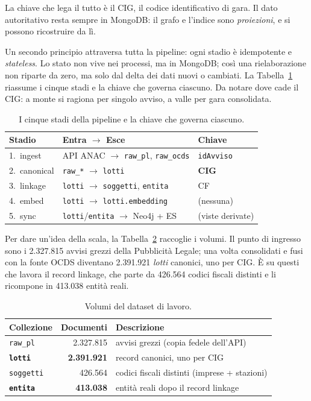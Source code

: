 \documentclass[11pt,a4paper]{article}
\begin{document}
\noindent
La chiave che lega il tutto è il CIG, il codice identificativo di gara. Il dato autoritativo
resta sempre in MongoDB: il grafo e l'indice sono \emph{proiezioni}, e si possono ricostruire
da lì.

Un secondo principio attraversa tutta la pipeline: ogni stadio è idempotente e \emph{stateless}.
Lo stato non vive nei processi, ma in MongoDB; così una rielaborazione non riparte da zero, ma
solo dal delta dei dati nuovi o cambiati. La Tabella~\ref{tab:stadi} riassume i cinque stadi e
la chiave che governa ciascuno. Da notare dove cade il CIG: a monte si ragiona per
singolo avviso, a valle per gara consolidata.

\begin{table}[H]
\centering
\footnotesize
\begin{tabular}{@{}lll@{}}
\toprule
\textbf{Stadio} & \textbf{Entra $\rightarrow$ Esce} & \textbf{Chiave}\\
\midrule
1.\ ingest    & API ANAC $\rightarrow$ \texttt{raw\_pl}, \texttt{raw\_ocds} & \texttt{idAvviso}\\
2.\ canonical & \texttt{raw\_*} $\rightarrow$ \texttt{lotti}                & \textbf{CIG}\\
3.\ linkage   & \texttt{lotti} $\rightarrow$ \texttt{soggetti}, \texttt{entita} & CF\\
4.\ embed     & \texttt{lotti} $\rightarrow$ \texttt{lotti.embedding}      & (nessuna)\\
5.\ sync      & \texttt{lotti}/\texttt{entita} $\rightarrow$ Neo4j + ES    & (viste derivate)\\
\bottomrule
\end{tabular}
\caption{I cinque stadi della pipeline e la chiave che governa ciascuno.}
\label{tab:stadi}
\end{table}

\noindent
Per dare un'idea della scala, la Tabella~\ref{tab:volumi} raccoglie i volumi. Il punto di
ingresso sono i 2.327.815 avvisi grezzi della Pubblicità Legale; una volta consolidati e fusi
con la fonte OCDS diventano 2.391.921 \emph{lotti} canonici, uno per CIG. È su questi che
lavora il record linkage, che parte da 426.564 codici fiscali distinti e li ricompone in
413.038 entità reali.

\begin{table}[H]
\centering
\begin{tabular}{@{}lrl@{}}
\toprule
\textbf{Collezione} & \textbf{Documenti} & \textbf{Descrizione}\\
\midrule
\texttt{raw\_pl}        & 2.327.815 & avvisi grezzi (copia fedele dell'API)\\
\textbf{\texttt{lotti}} & \textbf{2.391.921} & record canonici, uno per CIG\\
\texttt{soggetti}       & 426.564 & codici fiscali distinti (imprese + stazioni)\\
\textbf{\texttt{entita}}& \textbf{413.038} & entità reali dopo il record linkage\\
\bottomrule
\end{tabular}
\caption{Volumi del dataset di lavoro.}
\label{tab:volumi}
\end{table}
\end{document}
